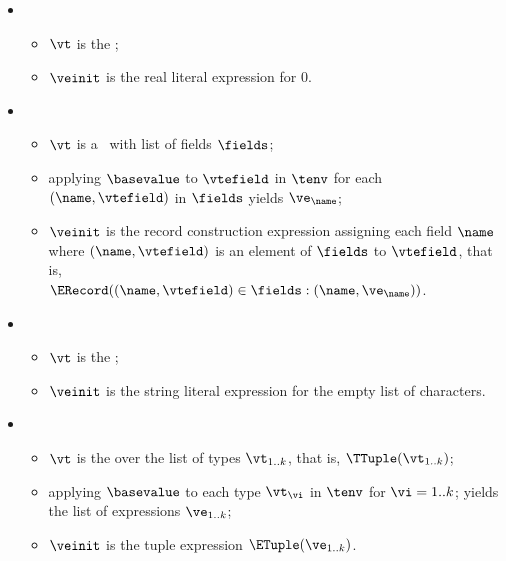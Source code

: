 \begin{itemize}
    \item {} 
    \begin{itemize}
        \item $\vt$ is the \realtypeterm{};
        \item $\veinit$ is the real literal expression for $0$.
    \end{itemize}

    \item {}  
    \begin{itemize}
        \item $\vt$ is a \structuredtypeterm\ with list of fields $\fields$;
        \item applying $\basevalue$ to $\vtefield$ in $\tenv$ for each $(\name, \vtefield)$ in $\fields$
              yields $\ve_\name$\ProseOrTypeError;
        \item $\veinit$ is the record construction expression assigning each field $\name$
              where $(\name, \vtefield)$ is an element of $\fields$ to $\vtefield$, that is, \\
              $\ERecord((\name, \vtefield) \in \fields: (\name, \ve_\name))$.
    \end{itemize}

    \item {} 
    \begin{itemize}
        \item $\vt$ is the \stringtypeterm{};
        \item $\veinit$ is the string literal expression for the empty list of characters.
    \end{itemize}

    \item {} 
    \begin{itemize}
        \item $\vt$ is the \tupletypeterm{} over the list of types $\vt_{1..k}$, that is, $\TTuple(\vt_{1..k})$;
        \item applying $\basevalue$ to each type $\vt_\vi$ in $\tenv$ for $\vi=1..k$; yields the list of expressions $\ve_{1..k}$;
        \item $\veinit$ is the tuple expression $\ETuple(\ve_{1..k})$.
    \end{itemize}


\end{itemize}
